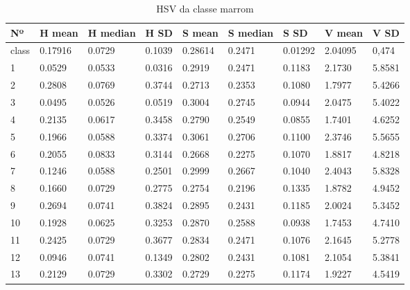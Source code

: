 \begin{anexosenv}
\begin{table}[htbp!]
\centering
\caption{HSV da classe marrom}
\label{tab:cores_classe_marrom}
\begin{tabular}{|l|l|l|l|l|l|l|l|l|}
\hline
Nº & H mean & H median & H SD & S mean & S median & S SD & V mean & V SD \\ \hline
class & 0.17916 & 0.0729   & 0.1039               & 0.28614 & 0.2471   & 0.01292              & 2.04095 & 0,474                \\\hline
1    & 0.0529  & 0.0533   & 0.0316               & 0.2919  & 0.2471   & 0.1183               & 2.1730  & 5.8581               \\
2    & 0.2808  & 0.0769   & 0.3744               & 0.2713  & 0.2353   & 0.1080               & 1.7977  & 5.4266               \\
3    & 0.0495  & 0.0526   & 0.0519               & 0.3004  & 0.2745   & 0.0944               & 2.0475  & 5.4022               \\
4    & 0.2135  & 0.0617   & 0.3458               & 0.2790  & 0.2549   & 0.0855               & 1.7401  & 4.6252               \\
5    & 0.1966  & 0.0588   & 0.3374               & 0.3061  & 0.2706   & 0.1100               & 2.3746  & 5.5655               \\
6    & 0.2055  & 0.0833   & 0.3144               & 0.2668  & 0.2275   & 0.1070               & 1.8817  & 4.8218               \\
7    & 0.1246  & 0.0588   & 0.2501               & 0.2999  & 0.2667   & 0.1040               & 2.4043  & 5.8328               \\
8    & 0.1660  & 0.0729   & 0.2775               & 0.2754  & 0.2196   & 0.1335               & 1.8782  & 4.9452               \\
9    & 0.2694  & 0.0741   & 0.3824               & 0.2895  & 0.2431   & 0.1185               & 2.0024  & 5.3452               \\
10   & 0.1928  & 0.0625   & 0.3253               & 0.2870  & 0.2588   & 0.0938               & 1.7453  & 4.7410               \\
11   & 0.2425  & 0.0729   & 0.3677               & 0.2834  & 0.2471   & 0.1076               & 2.1645  & 5.2778               \\
12   & 0.0946  & 0.0741   & 0.1349               & 0.2802  & 0.2431   & 0.1081               & 2.1054  & 5.3841               \\
13   & 0.2129  & 0.0729   & 0.3302               & 0.2729  & 0.2275   & 0.1174               & 1.9227  & 4.5419               \\

\end{tabular}
\end{table}
\end{anexosenv}
